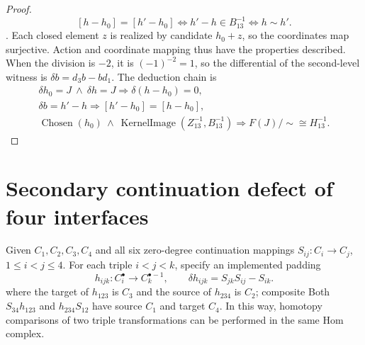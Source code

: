\documentclass[12pt,a4paper,openany,notitlepage]{report}
\theoremstyle{plain}
\theoremstyle{definition}
\theoremstyle{remark}
\def\mathcal#1{#1}\def\mathsf#1{#1}\def\mathbb#1{#1}%
\begin{document}
\begin{CJK*}
\begin{proof}
\[ [h-h_0]=[h'-h_0]
 \Longleftrightarrow h'-h\in B^{-1}_{13}
 \Longleftrightarrow h\sim h'.
\]. Each closed element $z$ is realized by candidate $h_0+z$, so the coordinates map surjective. Action and coordinate mapping thus have the properties described. When the division is $-2$, it is $(-1)^{-2}=1$, so the differential of the second-level witness is $\delta b=d_3b-bd_1$. The deduction chain is \[
 \begin{gathered}
 \delta h_0=J\ \land\ \delta h=J
 \Rightarrow\delta(h-h_0)=0,\\
 \delta b=h'-h
 \Rightarrow[h'-h_0]=[h-h_0],\\
 \operatorname{Chosen}(h_0)\ \land\
 \operatorname{KernelImage}(Z^{-1}_{13},B^{-1}_{13})
 \Rightarrow
 \mathcal F(J)/{\sim}\cong H^{-1}_{13}.
 \end{gathered}
\]\end{proof}


\section { Secondary continuation defect of four interfaces }\label{exp:hom:four-interfaces}


Given $C_1,C_2,C_3,C_4$ and all six zero-degree continuation mappings $S_{ij}:C_i\to C_j$, $1\le i<j\le4$. For each triple $i<j<k$, specify an implemented padding \[
 h_{ijk}:C_i^\bullet\to C_k^{\bullet-1},
 \qquad
 \delta h_{ijk}=S_{jk}S_{ij}-S_{ik}.
\] where the target of $h_{123}$ is $C_3$ and the source of $h_{234}$ is $C_2$; composite Both $S_{34}h_{123}$ and $h_{234}S_{12}$ have source $C_1$ and target $C_4$. In this way, homotopy comparisons of two triple transformations can be performed in the same Hom complex.


\end{CJK*}
\end{document}

